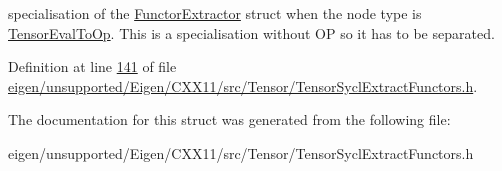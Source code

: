 specialisation of the \hyperlink{struct_eigen_1_1_tensor_sycl_1_1internal_1_1_functor_extractor}{Functor\+Extractor} struct when the node type is \hyperlink{class_eigen_1_1_tensor_eval_to_op}{Tensor\+Eval\+To\+Op}. This is a specialisation without OP so it has to be separated. 

Definition at line \hyperlink{eigen_2unsupported_2_eigen_2_c_x_x11_2src_2_tensor_2_tensor_sycl_extract_functors_8h_source_l00141}{141} of file \hyperlink{eigen_2unsupported_2_eigen_2_c_x_x11_2src_2_tensor_2_tensor_sycl_extract_functors_8h_source}{eigen/unsupported/\+Eigen/\+C\+X\+X11/src/\+Tensor/\+Tensor\+Sycl\+Extract\+Functors.\+h}.



The documentation for this struct was generated from the following file\+:\begin{DoxyCompactItemize}
\item 
eigen/unsupported/\+Eigen/\+C\+X\+X11/src/\+Tensor/\+Tensor\+Sycl\+Extract\+Functors.\+h\end{DoxyCompactItemize}
